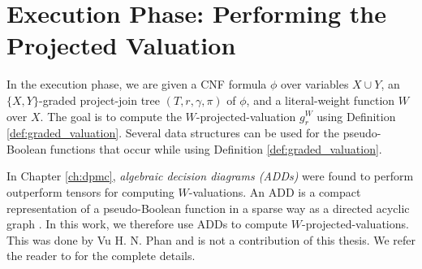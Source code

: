 \section{Execution Phase: Performing the Projected Valuation}
\label{sec:procount:execution}

In the execution phase, we are given a CNF formula $\phi$ over variables $X \cup Y$, an $\{X, Y\}$-graded project-join tree $(T, r, \gamma, \pi)$ of $\phi$, and a literal-weight function $W$ over $X$.
The goal is to compute the $W$-projected-valuation $g^W_r$ using Definition \ref{def:graded_valuation}.
Several data structures can be used for the pseudo-Boolean functions that occur while using Definition \ref{def:graded_valuation}.

In Chapter \ref{ch:dpmc}, \emph{algebraic decision diagrams (ADDs)} were found to perform outperform tensors for computing $W$-valuations.
An ADD is a compact representation of a pseudo-Boolean function in a sparse way as a directed acyclic graph \cite{bahar1997algebraic}.
In this work, we therefore use ADDs to compute $W$-projected-valuations.
This was done by Vu H. N. Phan and is not a contribution of this thesis. We refer the reader to \cite{phan2021phd} for the complete details.
